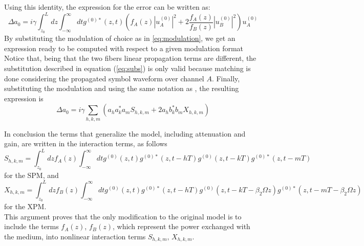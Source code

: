 \documentclass[10pt, lettersize, journal, onecolumn]{IEEEtran}
\begin{document}
Using this identity, the expression for the error can be written as:
\begin{equation}
	\Delta a_0 = i\gamma \int_{z_0}^{L} dz \int_{-\infty}^{\infty} dt g^{(0)*}(z, t) \left(f_A(z)|u_A^{(0)}|^2 + 2 \dfrac{f_A(z)}{f_B(z)}|u_B^{(0)}|^2\right) u_A^{(0)}
\end{equation}
By substituting the modulation of choice as in \ref{eq:modulation}, we get an expression ready to be computed with respect to a given modulation format
Notice that, being that the two fibers linear propagation terms are different, the substitution described in equation (\ref{eq:subs}) is only valid because matching is done considering the propagated symbol waveform over channel $A$.
Finally, substituting the modulation and using the same notation as \cite[eq. 5, 6, 7]{Dar_2013}, the resulting expression is
\begin{equation}
	\Delta a_0 = i \gamma \sum_{h, k, m} \left(a_h a_k^* a_m S_{h, k, m} + 2 a_h b_k^* b_m X_{h, k, m}\right)
\end{equation}

In conclusion the terms that generalize the model, including attenuation and gain, are written in the interaction terms, as follows
\begin{equation}
	S_{h, k, m} = \int_{z_0}^{L} dz f_A(z) \int_{-\infty}^{\infty} dt g^{(0)}(z, t) g^{(0)*}(z, t-hT) g^{(0)}(z, t-kT)g^{(0)*}(z, t-mT)
\end{equation}
for the SPM, and
\begin{equation}\label{eq:hkm}
	X_{h, k, m} = \int_{z_0}^{L} dz f_B(z) \int_{-\infty}^{\infty} dt g^{(0)}(z, t) g^{(0)*}(z, t-hT) g^{(0)}(z, t-kT -\beta_2 \Omega z)g^{(0)*}(z, t-mT-\beta_2 \Omega z)
\end{equation}
for the XPM.\\
This argument proves that the only modification to the original model is to include the terms $f_A(z)$, $f_B(z)$, which represent the power exchanged with the medium, into nonlinear interaction terms $S_{h, k, m}, \, X_{h, k, m}$. 
\end{document}

